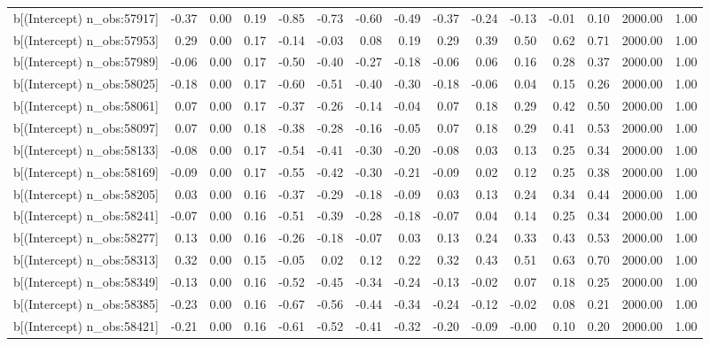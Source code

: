 \begin{table}[ht]
\begin{tabular}{rrrrrrrrrrrrrrr}
  b[(Intercept) n\_obs:57917] & -0.37 & 0.00 & 0.19 & -0.85 & -0.73 & -0.60 & -0.49 & -0.37 & -0.24 & -0.13 & -0.01 & 0.10 & 2000.00 & 1.00 \\ 
  b[(Intercept) n\_obs:57953] & 0.29 & 0.00 & 0.17 & -0.14 & -0.03 & 0.08 & 0.19 & 0.29 & 0.39 & 0.50 & 0.62 & 0.71 & 2000.00 & 1.00 \\ 
  b[(Intercept) n\_obs:57989] & -0.06 & 0.00 & 0.17 & -0.50 & -0.40 & -0.27 & -0.18 & -0.06 & 0.06 & 0.16 & 0.28 & 0.37 & 2000.00 & 1.00 \\ 
  b[(Intercept) n\_obs:58025] & -0.18 & 0.00 & 0.17 & -0.60 & -0.51 & -0.40 & -0.30 & -0.18 & -0.06 & 0.04 & 0.15 & 0.26 & 2000.00 & 1.00 \\ 
  b[(Intercept) n\_obs:58061] & 0.07 & 0.00 & 0.17 & -0.37 & -0.26 & -0.14 & -0.04 & 0.07 & 0.18 & 0.29 & 0.42 & 0.50 & 2000.00 & 1.00 \\ 
  b[(Intercept) n\_obs:58097] & 0.07 & 0.00 & 0.18 & -0.38 & -0.28 & -0.16 & -0.05 & 0.07 & 0.18 & 0.29 & 0.41 & 0.53 & 2000.00 & 1.00 \\ 
  b[(Intercept) n\_obs:58133] & -0.08 & 0.00 & 0.17 & -0.54 & -0.41 & -0.30 & -0.20 & -0.08 & 0.03 & 0.13 & 0.25 & 0.34 & 2000.00 & 1.00 \\ 
  b[(Intercept) n\_obs:58169] & -0.09 & 0.00 & 0.17 & -0.55 & -0.42 & -0.30 & -0.21 & -0.09 & 0.02 & 0.12 & 0.25 & 0.38 & 2000.00 & 1.00 \\ 
  b[(Intercept) n\_obs:58205] & 0.03 & 0.00 & 0.16 & -0.37 & -0.29 & -0.18 & -0.09 & 0.03 & 0.13 & 0.24 & 0.34 & 0.44 & 2000.00 & 1.00 \\ 
  b[(Intercept) n\_obs:58241] & -0.07 & 0.00 & 0.16 & -0.51 & -0.39 & -0.28 & -0.18 & -0.07 & 0.04 & 0.14 & 0.25 & 0.34 & 2000.00 & 1.00 \\ 
  b[(Intercept) n\_obs:58277] & 0.13 & 0.00 & 0.16 & -0.26 & -0.18 & -0.07 & 0.03 & 0.13 & 0.24 & 0.33 & 0.43 & 0.53 & 2000.00 & 1.00 \\ 
  b[(Intercept) n\_obs:58313] & 0.32 & 0.00 & 0.15 & -0.05 & 0.02 & 0.12 & 0.22 & 0.32 & 0.43 & 0.51 & 0.63 & 0.70 & 2000.00 & 1.00 \\ 
  b[(Intercept) n\_obs:58349] & -0.13 & 0.00 & 0.16 & -0.52 & -0.45 & -0.34 & -0.24 & -0.13 & -0.02 & 0.07 & 0.18 & 0.25 & 2000.00 & 1.00 \\ 
  b[(Intercept) n\_obs:58385] & -0.23 & 0.00 & 0.16 & -0.67 & -0.56 & -0.44 & -0.34 & -0.24 & -0.12 & -0.02 & 0.08 & 0.21 & 2000.00 & 1.00 \\ 
  b[(Intercept) n\_obs:58421] & -0.21 & 0.00 & 0.16 & -0.61 & -0.52 & -0.41 & -0.32 & -0.20 & -0.09 & -0.00 & 0.10 & 0.20 & 2000.00 & 1.00 \\ 

\end{tabular}
\end{table}
